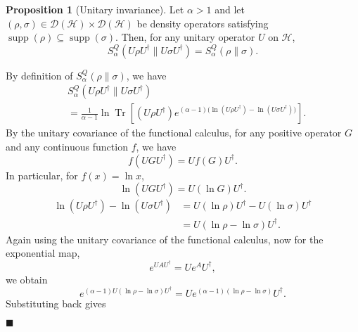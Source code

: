 \documentclass[a4paper, amsfonts, amssymb, amsmath, reprint, showkeys, nofootinbib, twoside, aps, pra]{revtex4-2}
\theoremstyle{definition}
\newtheorem{proposition}[theorem]{Proposition}
\renewenvironment{proof}{\noindent{\bfseries Proof.}}{\hfill$\blacksquare$}
\begin{document}
\begin{proposition}[Unitary invariance]
Let $\alpha >1$ and let
$(\rho,\sigma) \in \mathcal{D}(\mathcal{H}) \times \mathcal{D}(\mathcal{H})$
be density operators satisfying 
$\operatorname{supp}(\rho)\subseteq\operatorname{supp}(\sigma)$.
Then, for any unitary operator $U$ on $\mathcal{H}$,
\begin{equation}
S^Q_\alpha(U\rho U^\dagger \| U\sigma U^\dagger)
=
S^Q_\alpha(\rho \| \sigma).
\end{equation}
\end{proposition}

\begin{proof}
By definition of $S^Q_\alpha(\rho \| \sigma)$, we have
\begin{equation}
\begin{aligned}
&S^Q_\alpha(U\rho U^\dagger \| U\sigma U^\dagger) \\
&= \frac{1}{\alpha-1} \ln \operatorname{Tr} \left[ (U\rho U^\dagger) e^{(\alpha-1)\bigl(\ln(U\rho U^\dagger)-\ln(U\sigma U^\dagger)\bigr)} \right].
\end{aligned}
\end{equation}
By the unitary covariance of the functional calculus, for any positive operator $G$
and any continuous function $f$, we have
\begin{equation}
f(UGU^\dagger)
=
Uf(G)U^\dagger.
\end{equation}
In particular, for $f(x)=\ln x$,
\begin{equation}
\ln(U G U^\dagger)
=
U(\ln G)U^\dagger.
\end{equation}
\begin{equation}
\begin{aligned}
    \ln(U\rho U^\dagger) - \ln(U\sigma U^\dagger) 
    &= U(\ln\rho)U^\dagger - U(\ln\sigma)U^\dagger \\
    &= U(\ln\rho - \ln\sigma)U^\dagger.
\end{aligned}
\end{equation}
Again using the unitary covariance of the functional calculus, now for the 
exponential map,
\begin{equation}
e^{UAU^\dagger}
=
U e^A U^\dagger,
\end{equation}
we obtain
\begin{equation}
e^{(\alpha-1)U(\ln\rho-\ln\sigma)U^\dagger}
=
U e^{(\alpha-1)(\ln\rho-\ln\sigma)} U^\dagger.
\end{equation}
Substituting back gives
\begin{equation}
\begin{aligned}

\end{aligned}
\end{equation}
\end{proof}
\end{document}
